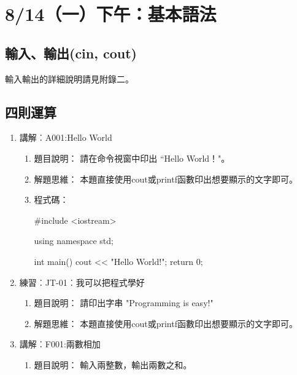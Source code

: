 \section{8/14（一）下午：基本語法}

	\subsection{輸入、輸出(cin, cout)}
	輸入輸出的詳細說明請見附錄二。
	\subsection{四則運算}
	
\begin{enumerate}
	\item 講解︰A001:Hello World
	\begin{enumerate}
	\item 題目說明：
	\subitem 請在命令視窗中印出 ``Hello World！"。
	
	\item 解題思維：
	\subitem 本題直接使用cout或printf函數印出想要顯示的文字即可。
	
	\item 程式碼：
	\begin{cppcode}
		#include <iostream>
		
		using namespace std;
		
		int main()
		{
			cout << "Hello World!";
			return 0;
		}
	\end{cppcode}
	\end{enumerate}
	
	\item 練習︰JT-01︰我可以把程式學好
		\begin{enumerate}
			\item 題目說明：
			\subitem 請印出字串 "Programming is easy!"
			
			\item 解題思維：
			\subitem 本題直接使用cout或printf函數印出想要顯示的文字即可。

		\end{enumerate}
	\item 講解︰F001:兩數相加%
		\begin{enumerate}
			\item 題目說明：
			\subitem 輸入兩整數，輸出兩數之和。
			

\end{enumerate}
\end{enumerate}
